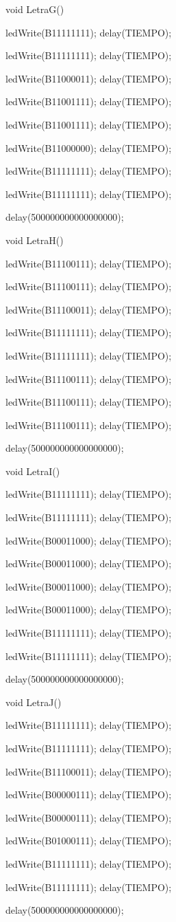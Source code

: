 \documentclass{article}
\begin{document}
void LetraG(){
   
   ledWrite(B11111111); delay(TIEMPO);
   
   ledWrite(B11111111); delay(TIEMPO);
   
   ledWrite(B11000011); delay(TIEMPO);
   
   ledWrite(B11001111); delay(TIEMPO);
   
   ledWrite(B11001111); delay(TIEMPO);
   
   ledWrite(B11000000); delay(TIEMPO);
   
   ledWrite(B11111111); delay(TIEMPO);
   
   ledWrite(B11111111); delay(TIEMPO);
  
  delay(500000000000000000);}

void LetraH(){
   
   ledWrite(B11100111); delay(TIEMPO);
   
   ledWrite(B11100111); delay(TIEMPO);
   
   ledWrite(B11100011); delay(TIEMPO);
   
   ledWrite(B11111111); delay(TIEMPO);
   
   ledWrite(B11111111); delay(TIEMPO);
   
   ledWrite(B11100111); delay(TIEMPO);
   
   ledWrite(B11100111); delay(TIEMPO);
   
   ledWrite(B11100111); delay(TIEMPO);
   
   delay(500000000000000000);}

void LetraI(){
   
   ledWrite(B11111111); delay(TIEMPO);
   
   ledWrite(B11111111); delay(TIEMPO);
   
   ledWrite(B00011000); delay(TIEMPO);
   
   ledWrite(B00011000); delay(TIEMPO);
   
   ledWrite(B00011000); delay(TIEMPO);
   
   ledWrite(B00011000); delay(TIEMPO);
   
   ledWrite(B11111111); delay(TIEMPO);
   
   ledWrite(B11111111); delay(TIEMPO);
   
   delay(500000000000000000);}

void LetraJ(){
   
   ledWrite(B11111111); delay(TIEMPO);
   
   ledWrite(B11111111); delay(TIEMPO);
   
   ledWrite(B11100011); delay(TIEMPO);
   
   ledWrite(B00000111); delay(TIEMPO);
   
   ledWrite(B00000111); delay(TIEMPO);
   
   ledWrite(B01000111); delay(TIEMPO);
   
   ledWrite(B11111111); delay(TIEMPO);
   
   ledWrite(B11111111); delay(TIEMPO);
   
   delay(500000000000000000);}
\end{document}
